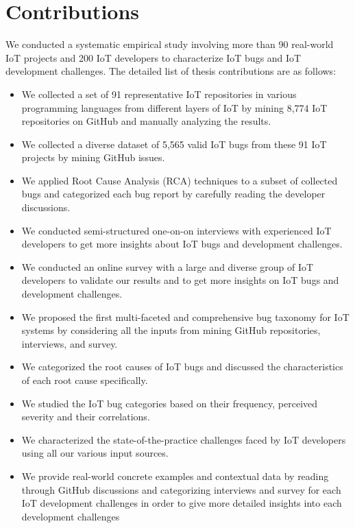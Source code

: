 \section{Contributions  }
We conducted a systematic empirical study involving more than 90 real-world IoT projects and 200 IoT developers to characterize IoT bugs and IoT development challenges. The detailed list of thesis contributions are as follows:

\begin{itemize}
\item {We collected a set of 91 representative IoT repositories in various programming languages from different layers of IoT by mining 8,774 IoT repositories on GitHub and manually analyzing the results.}
\item{We collected a diverse dataset of 5,565 valid IoT bugs from these 91 IoT projects by mining GitHub issues.}
\item{We applied Root Cause Analysis (RCA) techniques to a subset of collected bugs and categorized each bug report by carefully reading the developer discussions.}
\item {We conducted semi-structured one-on-on interviews with experienced IoT developers to get more insights about IoT bugs and development challenges.}
\item {We conducted an online survey with a large and diverse group of IoT developers to validate our results and to get more insights on IoT bugs and development challenges.}
\item {We proposed the first multi-faceted and comprehensive bug taxonomy for IoT systems by considering all the inputs from mining GitHub repositories, interviews, and survey.}
\item{We categorized the root causes of IoT bugs and discussed the characteristics of each root cause specifically.}
\item{We studied the IoT bug categories based on their frequency, perceived severity and their correlations.}
\item {We characterized the state-of-the-practice challenges faced by IoT developers using all our various input sources.} 
\item{We provide real-world concrete examples and contextual data by reading through GitHub discussions and categorizing interviews and survey for each IoT development challenges in order to give more detailed insights into each development challenges }
\end{itemize}

